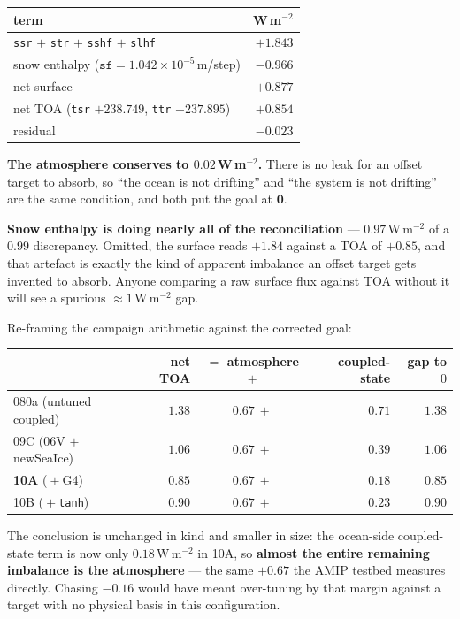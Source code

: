 \documentclass[10pt]{article}
\begin{document}
\begin{center}\footnotesize
\begin{tabular}{l r}
\toprule
term & W\,m$^{-2}$ \\
\midrule
\texttt{ssr} $+$ \texttt{str} $+$ \texttt{sshf} $+$ \texttt{slhf} & $+1.843$ \\
snow enthalpy ($\mathtt{sf}=1.042\times10^{-5}$\,m/step) & $-0.966$ \\
\midrule
net surface & $\mathbf{+0.877}$ \\
net TOA (\texttt{tsr} $+238.749$, \texttt{ttr} $-237.895$) & $\mathbf{+0.854}$ \\
\midrule
residual & $\mathbf{-0.023}$ \\
\bottomrule
\end{tabular}
\end{center}

\noindent \textbf{The atmosphere conserves to $0.02$\,W\,m$^{-2}$.} There is no leak for an
offset target to absorb, so ``the ocean is not drifting'' and ``the system is not drifting''
are the same condition, and both put the goal at $\mathbf{0}$.

\textbf{Snow enthalpy is doing nearly all of the reconciliation} --- $0.97$\,W\,m$^{-2}$ of a
$0.99$ discrepancy. Omitted, the surface reads $+1.84$ against a TOA of $+0.85$, and that
artefact is exactly the kind of apparent imbalance an offset target gets invented to absorb.
Anyone comparing a raw surface flux against TOA without it will see a spurious
${\approx}1$\,W\,m$^{-2}$ gap.

Re-framing the campaign arithmetic against the corrected goal:

\begin{center}\small
\begin{tabular}{l r c r r}
\toprule
 & net TOA & $=$ atmosphere $+$ & coupled-state & gap to $0$ \\
\midrule
080a (untuned coupled) & $1.38$ & $0.67\ +$ & $\mathbf{0.71}$ & $1.38$ \\
09C (06V $+$ newSeaIce) & $1.06$ & $0.67\ +$ & $\mathbf{0.39}$ & $1.06$ \\
\textbf{10A} (${}+$G4) & $\mathbf{0.85}$ & $0.67\ +$ & $\mathbf{0.18}$ & $\mathbf{0.85}$ \\
10B (${}+$\texttt{tanh}) & $0.90$ & $0.67\ +$ & $0.23$ & $0.90$ \\
\bottomrule
\end{tabular}
\end{center}

\noindent The conclusion is unchanged in kind and smaller in size: the ocean-side coupled-state
term is now only $0.18$\,W\,m$^{-2}$ in 10A, so \textbf{almost the entire remaining imbalance
is the atmosphere} --- the same $+0.67$ the AMIP testbed measures directly. Chasing $-0.16$
would have meant over-tuning by that margin against a target with no physical basis in this
configuration.
\end{document}
